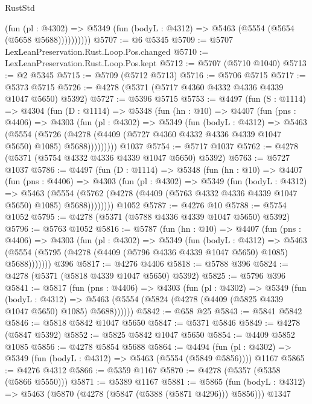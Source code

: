 \begin{lexlean}{RustStd}
\begin{coremodule}
{\begin{coremodule}
{{{{{{{{{{{{{{{{{{{{{{{{{{{{{{{{{{{              (fun (pl : @4302) =>
              @5349 (fun (bodyL : @4312) => @5463 (@5554 (@5654 (@5658 @5688))))))))))
@5707 := @6 @5345
@5709 := @5707 LexLeanPreservation.Rust.Loop.Pos.changed
@5710 := LexLeanPreservation.Rust.Loop.Pos.kept
@5712 := @5707 (@5710 @1040)
@5713 := @2 @5345
@5715 := @5709 (@5712 @5713)
@5716 := @5706 @5715
@5717 := @5373 @5715
@5726 := @4278 (@5371 (@5717 @4360 @4332 @4336 @4339 @1047 @5650) @5392)
@5727 := @5396 @5715
@5753 := @4497
    (fun (S : @1114) =>
    @4304
      (fun (D : @1114) =>
      @5348
        (fun (hn : @10) =>
        @4407
          (fun (pns : @4406) =>
          @4303
            (fun (pl : @4302) =>
            @5349
              (fun (bodyL : @4312) =>
              @5463
                (@5554
                  (@5726
                    (@4278 (@4409 (@5727 @4360 @4332 @4336 @4339 @1047 @5650) @1085) @5688)))))))))
    @1037
@5754 := @5717 @1037
@5762 := @4278 (@5371 (@5754 @4332 @4336 @4339 @1047 @5650) @5392)
@5763 := @5727 @1037
@5786 := @4497
    (fun (D : @1114) =>
    @5348
      (fun (hn : @10) =>
      @4407
        (fun (pns : @4406) =>
        @4303
          (fun (pl : @4302) =>
          @5349
            (fun (bodyL : @4312) =>
            @5463
              (@5554 (@5762 (@4278 (@4409 (@5763 @4332 @4336 @4339 @1047 @5650) @1085) @5688))))))))
    @1052
@5787 := @4276 @10
@5788 := @5754 @1052
@5795 := @4278 (@5371 (@5788 @4336 @4339 @1047 @5650) @5392)
@5796 := @5763 @1052
@5816 := @5787
    (fun (hn : @10) =>
    @4407
      (fun (pns : @4406) =>
      @4303
        (fun (pl : @4302) =>
        @5349
          (fun (bodyL : @4312) =>
          @5463 (@5554 (@5795 (@4278 (@4409 (@5796 @4336 @4339 @1047 @5650) @1085) @5688)))))))
    @396
@5817 := @4276 @4406
@5818 := @5788 @396
@5824 := @4278 (@5371 (@5818 @4339 @1047 @5650) @5392)
@5825 := @5796 @396
@5841 := @5817
    (fun (pns : @4406) =>
    @4303
      (fun (pl : @4302) =>
      @5349
        (fun (bodyL : @4312) =>
        @5463 (@5554 (@5824 (@4278 (@4409 (@5825 @4339 @1047 @5650) @1085) @5688))))))
@5842 := @658 @25
@5843 := @5841 @5842
@5846 := @5818 @5842 @1047 @5650
@5847 := @5371 @5846
@5849 := @4278 (@5847 @5392)
@5852 := @5825 @5842 @1047 @5650
@5854 := @4409 @5852 @1085
@5856 := @4278 @5854 @5688
@5864 := @4494
    (fun (pl : @4302) => @5349 (fun (bodyL : @4312) => @5463 (@5554 (@5849 @5856))))
    @1167
@5865 := @4276 @4312
@5866 := @5359 @1167
@5870 := @4278 (@5357 (@5358 (@5866 @5550)))
@5871 := @5389 @1167
@5881 := @5865
    (fun (bodyL : @4312) => @5463 (@5870 (@4278 (@5847 (@5388 (@5871 @4296))) @5856)))
    @1347
}}}}}}}}}}}}}}}}}}}}}}}}}}}}}}}}}}}
\end{coremodule}}
\end{coremodule}
\end{lexlean}
